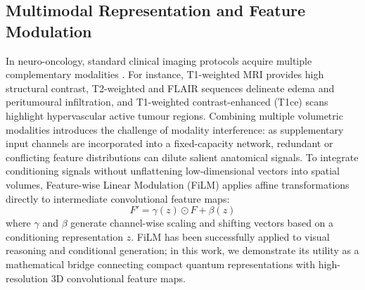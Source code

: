 \subsection{Multimodal Representation and Feature Modulation}
In neuro-oncology, standard clinical imaging protocols acquire multiple complementary modalities \cite{menze2014multimodal,baid2021rsna}. 
For instance, T1-weighted MRI provides high structural contrast, T2-weighted and FLAIR sequences delineate edema and peritumoural infiltration, and T1-weighted contrast-enhanced (T1ce) scans highlight hypervascular active tumour regions. 
Combining multiple volumetric modalities introduces the challenge of modality interference: as supplementary input channels are incorporated into a fixed-capacity network, redundant or conflicting feature distributions can dilute salient anatomical signals. 
To integrate conditioning signals without unflattening low-dimensional vectors into spatial volumes, Feature-wise Linear Modulation (FiLM) \cite{perez2018film} applies affine transformations directly to intermediate convolutional feature maps:
\begin{equation}
    F' = \gamma(z) \odot F + \beta(z)
\end{equation}
where $\gamma$ and $\beta$ generate channel-wise scaling and shifting vectors based on a conditioning representation $z$. 
FiLM has been successfully applied to visual reasoning and conditional generation; in this work, we demonstrate its utility as a mathematical bridge connecting compact quantum representations with high-resolution 3D convolutional feature maps.
